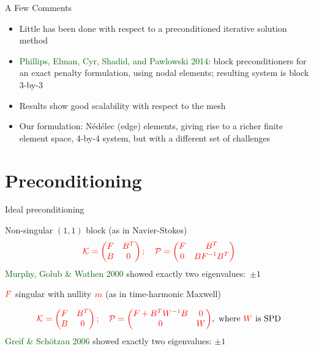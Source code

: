 \documentclass[12pt]{beamer}
\newcommand{\gr}[1]{\textcolor{darkgreen} {#1}}
\newcommand{\re}[1]{{\textcolor{red}       {#1}}}
\begin{document}
\begin{frame}{A Few Comments}
\begin{itemize}
    \item Little has been done with respect to a preconditioned iterative solution method
    \item   \gr{Phillips, Elman, Cyr, Shadid, and Pawlowski 2014}: block preconditioners for an exact penalty formulation, using nodal elements; resulting system is block 3-by-3
    \item Results show good scalability with respect to the mesh
    \item Our formulation: {N\'{e}d\'{e}lec} (edge) elements, giving rise to a richer finite element space, 4-by-4 system, but with a different set of challenges
\end{itemize}


\end{frame}



\section{Preconditioning}


\begin{frame}{Ideal preconditioning}

Non-singular $(1,1)$ block (as in Navier-Stokes)
\begin{equation}\nonumber
\re{\mathcal{K} = \begin{pmatrix}
F & B^T \\
B & 0
\end{pmatrix}; \quad
\mathcal{P}=\begin{pmatrix}
F & B^T\\
0 & B F^{-1} B^T
\end{pmatrix}}
\end{equation}
\gr{Murphy, Golub \& Wathen 2000} showed exactly two eigenvalues:~$\pm 1$ %

\vspace{5mm}
\pause
$\re{F}$ singular with nullity $\re{m}$ (as in time-harmonic Maxwell)

\begin{equation}\nonumber
\re{\mathcal{K} = \begin{pmatrix}
F & B^T \\
B & 0
\end{pmatrix}; \quad
\mathcal{P}=\begin{pmatrix}
F+B^T W^{-1} B & 0 \\
0 & W
\end{pmatrix}}, \ \mbox{where $\re{W}$ is SPD}
\end{equation}
\gr{Greif \& Sch{\"o}tzau 2006} showed exactly two eigenvalues: $\pm 1$

\end{frame}
\end{document}
